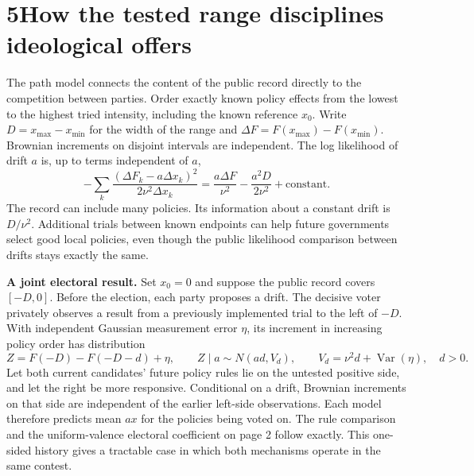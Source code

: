 \documentclass[11pt,letterpaper]{article}
\newcommand{\sect}[1]{\section*{\color{ink}#1}}
\newcommand{\lead}[1]{\textbf{#1}\enspace}
\newcommand{\Var}{\operatorname{Var}}
\begin{document}
\begin{center}
\end{center}

\newpage
\sect{5\quad How the tested range disciplines ideological offers}
The path model connects the content of the public record directly to the competition between parties. Order exactly known policy effects from the lowest to the highest tried intensity, including the known reference $x_0$. Write $D=x_{\max}-x_{\min}$ for the width of the range and $\Delta F=F(x_{\max})-F(x_{\min})$. Brownian increments on disjoint intervals are independent. The log likelihood of drift $a$ is, up to terms independent of $a$,
\[
 -\sum_k\frac{(\Delta F_k-a\Delta x_k)^2}{2\nu^2\Delta x_k}
 =\frac{a\Delta F}{\nu^2}-\frac{a^2D}{2\nu^2}+\mathrm{constant}.
\]
The record can include many policies. Its information about a constant drift is $D/\nu^2$. Additional trials between known endpoints can help future governments select good local policies, even though the public likelihood comparison between drifts stays exactly the same.

\lead{A joint electoral result.} Set $x_0=0$ and suppose the public record covers $[-D,0]$. Before the election, each party proposes a drift. The decisive voter privately observes a result from a previously implemented trial to the left of $-D$. With independent Gaussian measurement error $\eta$, its increment in increasing policy order has distribution
\[
 Z=F(-D)-F(-D-d)+\eta,\qquad
 Z\mid a\sim N(ad,V_d),\qquad V_d=\nu^2d+\Var(\eta),\quad d>0.
\]
Let both current candidates' future policy rules lie on the untested positive side, and let the right be more responsive. Conditional on a drift, Brownian increments on that side are independent of the earlier left-side observations. Each model therefore predicts mean $a x$ for the policies being voted on. The rule comparison and the uniform-valence electoral coefficient on page 2 follow exactly. This one-sided history gives a tractable case in which both mechanisms operate in the same contest.
\end{document}
